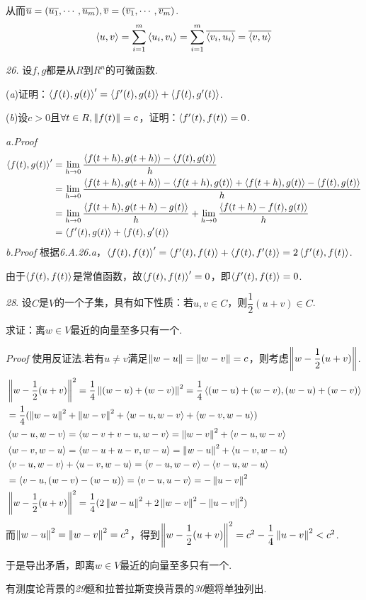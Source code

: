 从而\(\ol{u}=(\ol{u_1},\cdots,\ol{u_m}),\ol{v}=(\ol{v_1},\cdots,\ol{v_m})\).
    \begin{align*}
        \ip{u}{v}=\sum_{i=1}^m \ip{u_i}{v_i}=\sum_{i=1}^m \ol{\ip{v_i}{u_i}}=\ol{\ip{v}{u}}
    \end{align*}

\newpage

\textit{26.}
设\(f,g\)都是从\(R\)到\(R^n\)的可微函数.

(\textit{a})证明：\(\ip{f(t)}{g(t)}'=\ip{f'(t)}{g(t)}+\ip{f(t)}{g'(t)}\).

(\textit{b})设\(c>0\)且\(\forall t \in R,\norm{f(t)}=c\)，证明：\(\ip{f'(t)}{f(t)}=0\).

\textit{a.Proof}
    \begin{align*}
        \ip{f(t)}{g(t)}'&=\lim_{h \rightarrow 0}\dfrac{\ip{f(t+h)}{g(t+h)}-\ip{f(t)}{g(t)}}{h} \\
        &=\lim_{h \rightarrow 0}\dfrac{\ip{f(t+h)}{g(t+h)}-\ip{f(t+h)}{g(t)}+\ip{f(t+h)}{g(t)}-\ip{f(t)}{g(t)}}{h} \\
        &=\lim_{h \rightarrow 0}\dfrac{\ip{f(t+h)}{g(t+h)-g(t)}}{h}+\lim_{h \rightarrow 0}\dfrac{\ip{f(t+h)-f(t)}{g(t)}}{h} \\
        &=\ip{f'(t)}{g(t)}+\ip{f(t)}{g'(t)}
    \end{align*}
\textit{b.Proof}
根据\textit{6.A.26.a}，\(\ip{f(t)}{f(t)}'=\ip{f'(t)}{f(t)}+\ip{f(t)}{f'(t)}=2\ip{f'(t)}{f(t)}\).

由于\(\ip{f(t)}{f(t)}\)是常值函数，故\(\ip{f(t)}{f(t)}'=0\)，即\(\ip{f'(t)}{f(t)}=0\).

\hspace*{\fill}

\textit{28}.
设\(C\)是\(V\)的一个子集，具有如下性质：若\(u,v \in C\)，则\(\dfrac{1}{2}(u+v) \in C\).

求证：离\(w \in V\)最近的向量至多只有一个.

\textit{Proof}
使用反证法.若有\(u \ne v\)满足\(\norm{w-u}=\norm{w-v}=c\)，则考虑\(\norm{w-\dfrac{1}{2}(u+v)}\).
    \begin{align*}
        &\norm{w-\dfrac{1}{2}(u+v)}^2=\dfrac{1}{4}\norm{(w-u)+(w-v)}^2=\dfrac{1}{4}\ip{(w-u)+(w-v)}{(w-u)+(w-v)} \\
        &=\dfrac{1}{4}(\norm{w-u}^2+\norm{w-v}^2+\ip{w-u}{w-v}+\ip{w-v}{w-u}) \\
        &\ip{w-u}{w-v}=\ip{w-v+v-u}{w-v}=\norm{w-v}^2+\ip{v-u}{w-v} \\
        &\ip{w-v}{w-u}=\ip{w-u+u-v}{w-u}=\norm{w-u}^2+\ip{u-v}{w-u} \\
        &\ip{v-u}{w-v}+\ip{u-v}{w-u}=\ip{v-u}{w-v}-\ip{v-u}{w-u} \\
        &=\ip{v-u}{(w-v)-(w-u)}=\ip{v-u}{u-v}=-\norm{u-v}^2 \\
        &\norm{w-\dfrac{1}{2}(u+v)}^2=\dfrac{1}{4}(2\norm{w-u}^2+2\norm{w-v}^2-\norm{u-v}^2)
    \end{align*}
而\(\norm{w-u}^2=\norm{w-v}^2=c^2\)，得到\(\norm{w-\dfrac{1}{2}(u+v)}^2=c^2-\dfrac{1}{4}\norm{u-v}^2<c^2\).

于是导出矛盾，即离\(w \in V\)最近的向量至多只有一个.

\hspace*{\fill}

有测度论背景的\textit{29}题和拉普拉斯变换背景的\textit{30}题将单独列出.

